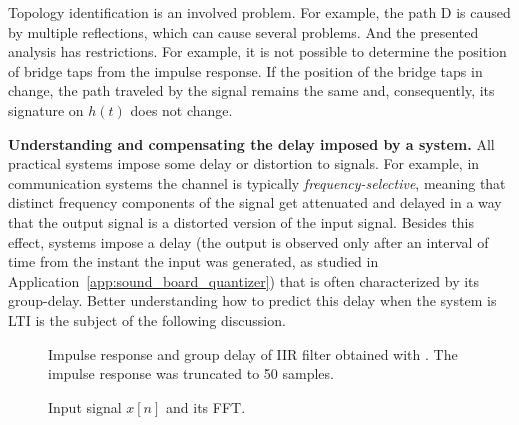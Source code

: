 Topology identification is an involved problem. For example, the path D is caused by multiple reflections, which can cause several problems. And the presented analysis has restrictions. For example, it is not possible to determine the position of bridge taps from the impulse response. If the position of the bridge taps in  change, the path traveled by the signal remains the same and, consequently, its signature on $h(t)$ does not change.
\eApplication

\bApplication
\textbf{Understanding and compensating the delay imposed by a system.}
\label{app:groupdelay}
All practical systems impose some delay or distortion to signals. For example, in communication systems the channel is typically  \emph{frequency-selective}, meaning that distinct frequency components of the signal get attenuated and delayed in a way that the output signal is a distorted version of the input signal. Besides this effect, systems impose a delay (the output is observed only after an interval of time from the instant the input was generated, as studied in Application~\ref{app:sound_board_quantizer}) that is often characterized by its group-delay. Better understanding how to predict this delay when the system is LTI is the subject of the following discussion.

\begin{figure}
\centering
  \caption[{Impulse response and group delay of IIR filter obtained with .}]{Impulse response and group delay of IIR filter obtained with . The impulse response was truncated to 50 samples.}
  \label{fig:butter_8_example}
\end{figure}

\begin{figure}
\centering
  \caption{Input signal $x[n]$ and its FFT.}
  \label{fig:butter_8_input}
\end{figure}

